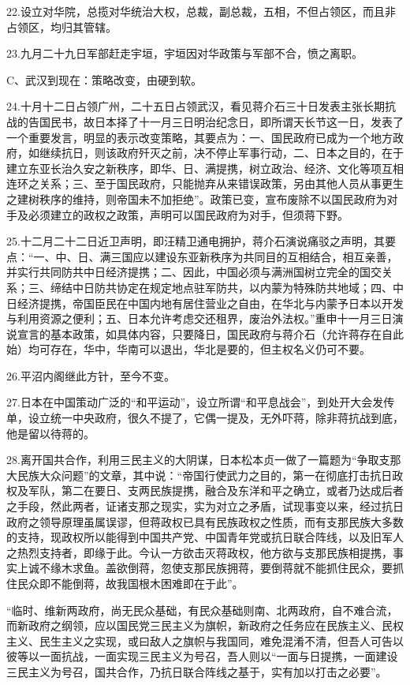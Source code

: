 22.设立对华院，总揽对华统治大权，总裁，副总裁，五相，不但占领区，而且非占领区，均归其管辖。

23.九月二十九日军部赶走宇垣，宇垣因对华政策与军部不合，愤之离职。

C、武汉到现在：策略改变，由硬到软。

24.十月十二日占领广州，二十五日占领武汉，看见蒋介石三十日发表主张长期抗战的告国民书，故日本择了十一月三日明治纪念日，即所谓天长节这一日，发表了一个重要发言，明显的表示改变策略，其要点为：一、国民政府已成为一个地方政府，如继续抗日，则该政府歼灭之前，决不停止军事行动，二、日本之目的，在于建立东亚长治久安之新秩序，即华、日、满提携，树立政治、经济、文化等项互相连环之关系；三、至于国民政府，只能抛弃从来错误政策，另由其他人员从事更生之建树秩序的维持，则帝国未不加拒绝”。政策已变，宣布废除不以国民政府为对手及必须建立的政权之政策，声明可以国民政府为对手，但须蒋下野。

25.十二月二十二日近卫声明，即汪精卫通电拥护，蒋介石演说痛驳之声明，其要点：“一、中、日、满三国应以建设东亚新秩序为共同目的互相结合，相互亲善，并实行共同防共中日经济提携；二、因此，中国必须与满洲国树立完全的国交关系；三、缔结中日防共协定在规定地点驻军防共，以内蒙为特殊防共地域；四、中日经济提携，帝国臣民在中国内地有居住营业之自由，在华北与内蒙予日本以开发与利用资源之便利；五、日本允许考虑交还租界，废治外法权。”重申十一月三日演说宣言的基本政策，如具体内容，只要降日，国民政府与蒋介石（允许蒋存在自此始）均可存在，华中，华南可以退出，华北是要的，但主权名义仍可不要。

26.平沼内阁继此方针，至今不变。

27.日本在中国策动广泛的“和平运动”，设立所谓“和平息战会”，到处开大会发传单，设立统一中央政府，很久不提了，它偶一提及，无外吓蒋，除非蒋抗战到底，他是留以待蒋的。

28.离开国共合作，利用三民主义的大阴谋，日本松本贞一做了一篇题为“争取支那大民族大众问题”的文章，其中说：“帝国行使武力之目的，第一在彻底打击抗日政权及军队，第二在要日、支两民族提携，融合及东洋和平之确立，或者乃达成后者之手段，然此两者，证诸支那之现实，实为对立之矛盾，试现事变以来，经过抗日政府之领导原理虽属误谬，但蒋政权已具有民族政权之性质，而有支那民族大多数的支持，现政权所以能得到中国共产党、中国青年党或抗日联合阵线，以及旧军人之热烈支持者，即缘于此。今认一方欲击灭蒋政权，他方欲与支那民族相提携，事实上诚不缘木求鱼。盖欲倒蒋，忽使支那民族拥蒋，要倒蒋就不能抓住民众，要抓住民众即不能倒蒋，故我国根木困难即在于此”。

“临时、维新两政府，尚无民众基础，有民众基础则南、北两政府，自不难合流，而新政府之纲领，应以国民党三民主义为旗帜，新政府之任务应在民族主义、民权主义、民生主义之实现，或曰敌人之旗帜与我国同，难免混淆不清，但吾人可告以彼等以一面抗战，一面实现三民主义为号召，吾人则以“一面与日提携，一面建设三民主义为号召，国共合作，乃抗日联合阵线之基于，实有加以打击之必要”。

